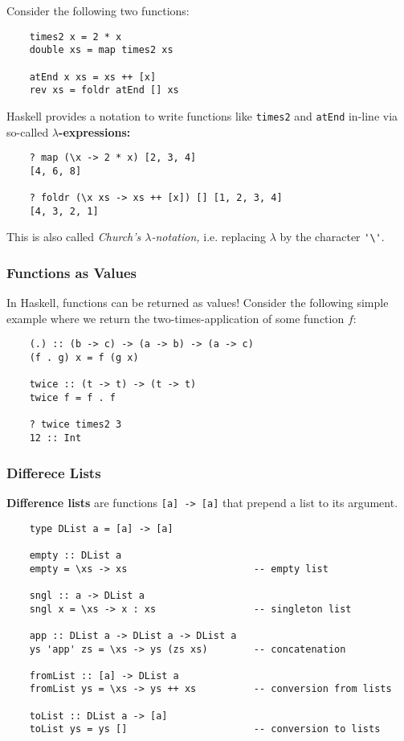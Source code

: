 \documentclass[a4paper]{extarticle}
\begin{document}
Consider the following two functions:
\begin{verbatim}
    times2 x = 2 * x
    double xs = map times2 xs

    atEnd x xs = xs ++ [x]
    rev xs = foldr atEnd [] xs
\end{verbatim}

Haskell provides a notation to write functions like \verb|times2| and \verb|atEnd| in-line via so-called \textbf{\(\lambda\)-expressions:}
\begin{verbatim}
    ? map (\x -> 2 * x) [2, 3, 4]
    [4, 6, 8]

    ? foldr (\x xs -> xs ++ [x]) [] [1, 2, 3, 4]
    [4, 3, 2, 1]
\end{verbatim}

This is also called \textit{Church's \(\lambda\)-notation,} i.e. replacing \(\lambda\) by the character \verb|'\'|.

\subsubsection{Functions as Values}

In Haskell, functions can be returned as values! Consider the following simple example where we return the two-times-application of some function \(f\):
\begin{verbatim}
    (.) :: (b -> c) -> (a -> b) -> (a -> c)
    (f . g) x = f (g x)

    twice :: (t -> t) -> (t -> t)
    twice f = f . f

    ? twice times2 3
    12 :: Int
\end{verbatim}

\subsubsection{Differece Lists}

\textbf{Difference lists} are functions \verb|[a] -> [a]| that prepend a list to its argument.
\begin{verbatim}
    type DList a = [a] -> [a]

    empty :: DList a
    empty = \xs -> xs                      -- empty list

    sngl :: a -> DList a
    sngl x = \xs -> x : xs                 -- singleton list

    app :: DList a -> DList a -> DList a
    ys 'app' zs = \xs -> ys (zs xs)        -- concatenation

    fromList :: [a] -> DList a
    fromList ys = \xs -> ys ++ xs          -- conversion from lists

    toList :: DList a -> [a]
    toList ys = ys []                      -- conversion to lists
\end{verbatim}
\end{document}
